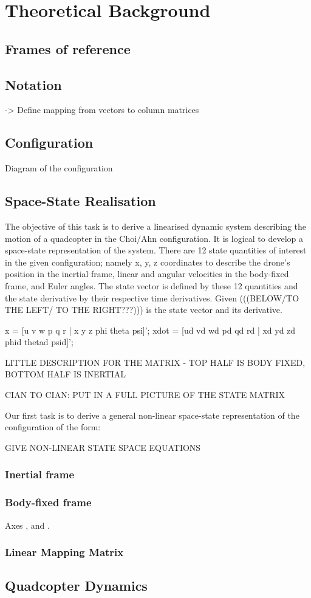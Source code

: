 \section{Theoretical Background}

\subsection{Frames of reference}

\subsection{Notation} %
-> Define mapping from vectors to column matrices
\subsection{Configuration}
Diagram of the configuration

\subsection{Space-State Realisation}
The objective of this task is to derive a linearised dynamic system describing the motion of a quadcopter in the Choi/Ahn configuration. It is logical to develop a space-state representation of the system. There are 12 state quantities of interest in the given configuration; namely x, y, z coordinates to describe the drone's position in the inertial frame, linear and angular velocities in the body-fixed frame, and Euler angles. The state vector is defined by these 12 quantities and the state derivative by their respective time derivatives. Given (((BELOW/TO THE LEFT/ TO THE RIGHT???))) is the state vector and its derivative.

x = [u v w p q r | x y z phi theta psi]';
xdot = [ud vd wd pd qd rd | xd yd zd phid thetad psid]';

LITTLE DESCRIPTION FOR THE MATRIX - TOP HALF IS BODY FIXED, BOTTOM HALF IS INERTIAL

CIAN TO CIAN: PUT IN A FULL PICTURE OF THE STATE MATRIX

Our first task is to derive a general non-linear space-state representation of the configuration of the form:

GIVE NON-LINEAR STATE SPACE EQUATIONS

\subsubsection[Inertial frame]{Inertial frame } %
\subsubsection[Body-fixed frame]{Body-fixed frame }
Axes ,  and .
\subsubsection[Linear Mapping Matrix]{Linear Mapping Matrix }
\label{sss:lmapmatQ}

\subsection{Quadcopter Dynamics}
